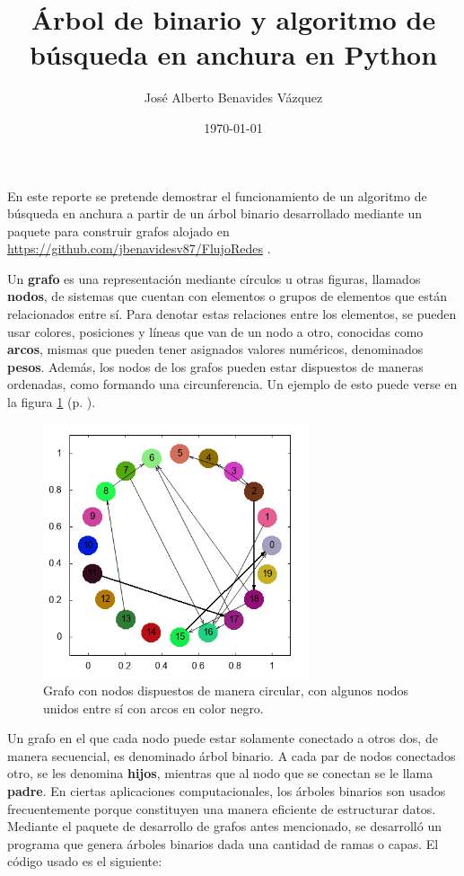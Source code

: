 \documentclass{article}
\title{Árbol de binario y algoritmo de búsqueda en anchura en Python}
\author{José Alberto Benavides Vázquez}
\date{\today}
\begin{document}
  \maketitle

  En este reporte se pretende demostrar el funcionamiento de un algoritmo de búsqueda en anchura a partir de un árbol binario desarrollado mediante un paquete para construir grafos alojado en \url{https://github.com/jbenavidesv87/FlujoRedes} \cite{Grafos}.

  Un \textbf{grafo} es una representación mediante círculos u otras figuras, llamados \textbf{nodos}, de sistemas que cuentan con elementos o grupos de elementos que están relacionados entre sí. Para denotar estas relaciones entre los elementos, se pueden usar colores, posiciones y líneas que van de un nodo a otro, conocidas como \textbf{arcos}, mismas que pueden tener asignados valores numéricos, denominados \textbf{pesos}. Además, los nodos de los grafos pueden estar dispuestos de maneras ordenadas, como formando una circunferencia. Un ejemplo de esto puede verse en la figura \ref{grafoCircular} (p. \pageref{grafoCircular}).

  \begin{figure}[h]
    \includegraphics[width=0.7\textwidth]{grafoCircular}
    \centering
    \caption{Grafo con nodos dispuestos de manera circular, con algunos nodos unidos entre sí con arcos en color negro.}
    \label{grafoCircular}
  \end{figure}

  Un grafo en el que cada nodo puede estar solamente conectado a otros dos, de manera secuencial, es denominado árbol binario. A cada par de nodos conectados otro, se les denomina \textbf{hijos}, mientras que al nodo que se conectan se le llama \textbf{padre}. En ciertas aplicaciones computacionales, los árboles binarios son usados frecuentemente porque constituyen una manera eficiente de estructurar datos\cite{artComputerProgramming}. Mediante el paquete de desarrollo de grafos antes mencionado, se desarrolló un programa que genera árboles binarios dada una cantidad de ramas o capas. El código usado es el siguiente:
\end{document}

